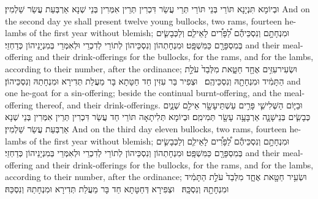 {וּבְיוֹמָא תִּנְיָנָא תּוֹרֵי בְּנֵי תּוֹרֵי תְּרֵי עֲשַׂר דִּכְרִין תְּרֵין אִמְּרִין בְּנֵי שְׁנָא אַרְבְּעַת עֲשַׂר שַׁלְמִין׃}
{And on the second day ye shall present twelve young bullocks, two rams, fourteen he-lambs of the first year without blemish;}{}
{וּמִנְחָתָ֣ם וְנִסְכֵּיהֶ֡ם לַ֠פָּרִ֠ים לָאֵילִ֧ם וְלַכְּבָשִׂ֛ים בְּמִסְפָּרָ֖ם כַּמִּשְׁפָּֽט׃}
{וּמִנְחָתְהוֹן וְנִסְכֵּיהוֹן לְתוֹרֵי לְדִכְרֵי וּלְאִמְּרֵי בְּמִנְיָנֵיהוֹן כְּדַחְזֵי׃}
{and their meal-offering and their drink-offerings for the bullocks, for the rams, and for the lambs, according to their number, after the ordinance;}{}
{וּשְׂעִיר\maqqaf עִזִּ֥ים אֶחָ֖ד חַטָּ֑את מִלְּבַד֙ עֹלַ֣ת הַתָּמִ֔יד וּמִנְחָתָ֖הּ וְנִסְכֵּיהֶֽם׃ \setuma }
{וּצְפִיר בַּר עִזִּין חַד חַטָּתָא בָּר מֵעֲלַת תְּדִירָא וּמִנְחָתַהּ וְנִסְכֵּיהוֹן׃}
{and one he-goat for a sin-offering; beside the continual burnt-offering, and the meal-offering thereof, and their drink-offerings.}{}
{וּבַיּ֧וֹם הַשְּׁלִישִׁ֛י פָּרִ֥ים עַשְׁתֵּי\maqqaf עָשָׂ֖ר אֵילִ֣ם שְׁנָ֑יִם כְּבָשִׂ֧ים בְּנֵי\maqqaf שָׁנָ֛ה אַרְבָּעָ֥ה עָשָׂ֖ר תְּמִימִֽם׃}
{וּבְיוֹמָא תְּלִיתָאָה תּוֹרֵי חַד עֲשַׂר דִּכְרִין תְּרֵין אִמְּרִין בְּנֵי שְׁנָא אַרְבְּעַת עֲשַׂר שַׁלְמִין׃}
{And on the third day eleven bullocks, two rams, fourteen he-lambs of the first year without blemish;}{}
{וּמִנְחָתָ֣ם וְנִסְכֵּיהֶ֡ם לַ֠פָּרִ֠ים לָאֵילִ֧ם וְלַכְּבָשִׂ֛ים בְּמִסְפָּרָ֖ם כַּמִּשְׁפָּֽט׃}
{וּמִנְחָתְהוֹן וְנִסְכֵּיהוֹן לְתוֹרֵי לְדִכְרֵי וּלְאִמְּרֵי בְּמִנְיָנֵיהוֹן כְּדַחְזֵי׃}
{and their meal-offering and their drink-offerings for the bullocks, for the rams, and for the lambs, according to their number, after the ordinance;}{}
{וּשְׂעִ֥יר חַטָּ֖את אֶחָ֑ד מִלְּבַד֙ עֹלַ֣ת הַתָּמִ֔יד וּמִנְחָתָ֖הּ וְנִסְכָּֽהּ׃ \setuma }
{וּצְפִירָא דְּחַטָּתָא חַד בָּר מֵעֲלַת תְּדִירָא וּמִנְחָתַהּ וְנִסְכַּהּ׃}
